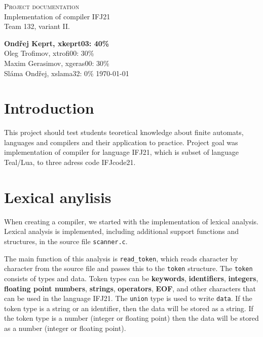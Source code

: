 \documentclass[11pt]{article}
\begin{document}
\begin{titlepage}
    \begin{center}

        
        \textsc{\Huge Project documentation}\\
        \LARGE
            Implementation of compiler IFJ21    \\
            Team 132, variant II.
    \end{center}

    \noindent\textbf{Ondřej Keprt, xkeprt03: 40\%}\\
    Oleg Trofimov, xtrofi00: 30\%    \\
    Maxim Gerasimov, xgeras00: 30\%  \\
    Sláma Ondřej, xslama32: 0\%   \hfill    \today

\end{titlepage}

\newpage
\tableofcontents
\thispagestyle{empty}
\newpage
\setcounter{page}{1}


\section*{Introduction}
This project should test students teoretical knowledge about finite automats, languages and compilers and their application to practice. Project goal was implementation of compiler
for language IFJ21, which is subset of language Teal/Lua, to three adress code IFJcode21.


\section{Lexical anylisis}
When creating a compiler, we started with the implementation of lexical analysis. Lexical analysis is implemented, including additional support functions and structures, in the source file \texttt{scanner.c}. 

The main function of this analysis is \texttt {read\_token}, which reads character by character from the source file and passes this to the \texttt{token} structure. The \texttt{token} consists of types and data. Token types can be \textbf{keywords}, \textbf{identifiers}, \textbf{integers}, \textbf{floating point numbers}, \textbf{strings}, \textbf{operators}, \textbf{EOF}, and other characters that can be used in the language IFJ21. The \texttt{union} type is used to write \texttt{data}. If the token type is a string or an identifier, then the data will be stored as a string. If the token type is a number (integer or floating point) then the data will be stored as a number (integer or floating point). 
\end{document}
